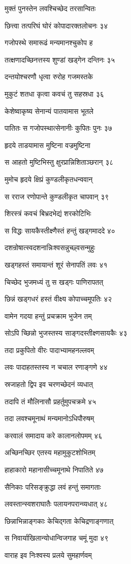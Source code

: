 मुक्तं पुनस्तेन लवश्चिच्छेद तरसान्वितः

छित्त्वा तत्परिघं घोरं कोपादारक्तलोचनः ३४

गजोपस्थे समारूढं मन्यमानश्चुकोप ह

तत्क्षणादच्छिनत्तस्य शुण्डां खड्गेन दन्तिनः ३५

दन्तयोश्चरणौ धृत्वा रुरोह गजमस्तके

मुकुटं शतधा कृत्वा कवचं तु सहस्रधा ३६

केशेष्वाकृष्य सेनान्यं पातयामास भूतले

पातितः स गजोपस्थात्सेनानीः कुपितः पुनः ३७

हृदये ताडयामास मुष्टिना वज्रमुष्टिना

स आहतो मुष्टिभिस्तु क्षुरप्रान्निशिताञ्छरान् ३८

मुमोच हृदये क्षिप्रं कुण्डलीकृतधन्ववान्

स रराज रणोपान्ते कुण्डलीकृत चापवान् ३९

शिरस्त्रं कवचं बिभ्रदभेद्यं शरकोटिभिः

स विद्धः सायकैस्तीक्ष्णैस्तं हन्तुं खड्गमाददे ४०

दशन्रोषात्स्वदशनान्निःश्वसन्नुच्छ्वसन्मुहुः

खड्गहस्तं समायान्तं शूरं सेनापतिं लवः ४१

चिच्छेद भुजमध्यं तु स खड्गः पाणिरापतत्

छिन्नं खड्गधरं हस्तं वीक्ष्य कोपाच्चमूपतिः ४२

वामेन गदया हन्तुं प्रचक्राम भुजेन तम्

सोऽपि च्छिन्नो भुजस्तस्य साङ्गदस्तीक्ष्णसायकैः ४३

तदा प्रकुपितो वीरः पादाभ्यामहनल्लवम्

लवः पादाहतस्तस्य न चचाल रणाङ्गणे ४४

स्रजाहतो द्विप इव चरणच्छेदनं व्यधात्

तदापि तं मौलिनासौ प्रहर्तुमुपचक्रमे ४५

तदा लवश्चमूनाथं मन्यमानोऽधिपौरुषम्

करवालं समादाय करे कालानलोपमम् ४६

अच्छिनच्छिर एतस्य महामुकुटशोभितम्

हाहाकारो महानासीच्चमूनाथे निपातिते ४७

सैनिकाः परिसङ्क्रुद्धा लवं हन्तुं समागताः

लवस्तान्स्वशराघातैः पलायनपरान्व्यधात् ४८

छिन्नाभिन्नाङ्गकाः केचिद्गता केचिद्रणाङ्गणात्

स निवार्याखिलान्योधान्विजगाह चमूं मुदा ४९

वाराह इव निःश्वस्य प्रलये सुमहार्णवम्

